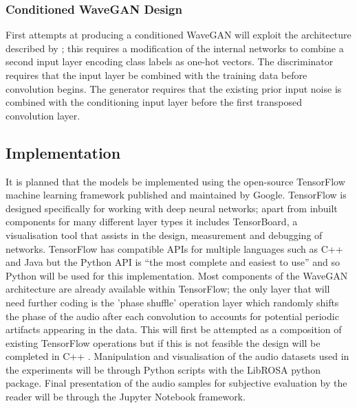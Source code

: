 \documentclass[a4paper, dvipsnames, titlepage]{article}
\begin{document}
\subsubsection{Conditioned WaveGAN Design}

First attempts at producing a conditioned WaveGAN will exploit the architecture described by \citeauthor{2014arXiv1411.1784M}; this requires a modification of the internal networks to combine a second input layer encoding class labels as one-hot vectors.
The discriminator requires that the input layer be combined with the training data before convolution begins.
The generator requires that the existing prior input noise is combined with the conditioning input layer before the first transposed convolution layer.

\subsection{Implementation}

It is planned that the models be implemented using the open-source TensorFlow machine learning framework published and maintained by Google.
TensorFlow is designed specifically for working with deep neural networks; apart from inbuilt components for many different layer types it includes TensorBoard, a visualisation tool that assists in the design, measurement and debugging of networks.
TensorFlow has compatible APIs for multiple languages such as C++ and Java but the Python API is ``the most complete and easiest to use'' \citep{TensorFlowAPI} and so Python will be used for this implementation.
\newline
\newline
Most components of the WaveGAN architecture are already available within TensorFlow; the only layer that will need further coding is the 'phase shuffle' operation layer which randomly shifts the phase of the audio after each convolution to accounts for potential periodic artifacts appearing in the data.
This will first be attempted as a composition of existing TensorFlow operations but if this is not feasible the design will be completed in C++ \citep{TensorFlowAPIOps}.
\newline
\newline
Manipulation and visualisation of the audio datasets used in the experiments will be through Python scripts with the LibROSA python package.
Final presentation of the audio samples for subjective evaluation by the reader will be through the Jupyter Notebook framework.
\end{document}
